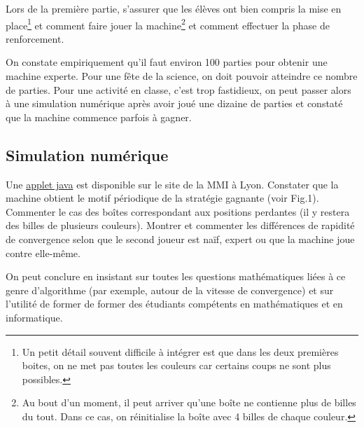 \documentclass[a4paper,12pt]{article}
\begin{document}
Lors de la première partie, s'assurer que les élèves ont bien compris la mise en place\footnote{Un petit détail souvent difficile à intégrer est que dans les deux premières boites, on ne met pas toutes les couleurs car certains coups ne sont plus possibles.} et comment faire jouer la machine\footnote{Au bout d'un moment, il peut arriver qu'une boîte ne contienne plus de billes du tout. Dans ce cas, on réinitialise la boîte avec 4 billes de chaque couleur.} et comment effectuer la phase de renforcement.


  On constate empiriquement qu'il faut environ 100 parties pour obtenir une machine experte. Pour une fête de la science, on doit pouvoir atteindre ce nombre de parties. Pour une activité en classe, c'est trop fastidieux, on peut passer alors à une simulation numérique après avoir joué une dizaine de parties et constaté que la machine commence parfois à gagner.

% 
% 
% 
%   
%   
%   

\subsection{Simulation numérique}
\label{simulation-numuxe9rique}

Une
\href{https://u.pcloud.link/publink/show?code=XZsn7zVZrWj4xUeBzmhLp8Pxd7ismY5ezrMX}{applet
java} est disponible sur le site de la MMI\cite{MMI} à Lyon. Constater que la machine obtient le motif périodique de la stratégie gagnante (voir Fig.1). Commenter le cas des boîtes correspondant aux positions perdantes (il y restera des billes de plusieurs couleurs). Montrer et commenter les différences de rapidité de convergence selon que le second joueur est naïf, expert ou que la machine joue contre elle-même.

On peut conclure en insistant sur toutes les questions mathématiques liées à ce genre d'algorithme (par exemple, autour de la vitesse de convergence) et sur l'utilité de former de former des étudiants compétents en mathématiques et en informatique.
\end{document}
